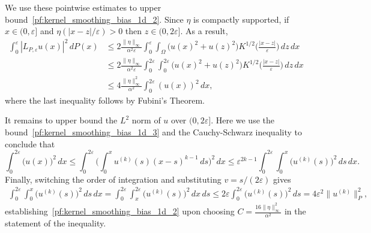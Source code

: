 \documentclass{article}
\newcommand{\1}{\mathbf{1}}
\newcommand{\Leb}{L}
\theoremstyle{definition}
\theoremstyle{remark}
\begin{document}
We use these pointwise estimates to upper bound~\eqref{pf:kernel_smoothing_bias_1d_2}. Since $\eta$ is compactly supported, if $x \in (0,\varepsilon]$ and $\eta(|x - z|/\varepsilon) > 0$ then $z \in (0,2\varepsilon]$. As a result,
\begin{align*}
\int_{0}^{\varepsilon} |L_{P,\varepsilon}u(x)|^2 \,dP(x) & \leq 2\frac{\|\eta\|_{\infty}}{\alpha^2\varepsilon} \int_{0}^{\varepsilon}  \int_{\Omega} \bigl(u(x)^2 + u(z)^2\bigr) K^{1/2}\biggl(\frac{|x - z|}{\varepsilon}\biggr) \,dz \,dx \\
& \leq 2\frac{\|\eta\|_{\infty}}{\alpha^2\varepsilon} \int_{0}^{2\varepsilon}  \int_{0}^{2\varepsilon} \bigl(u(x)^2 + u(z)^2\bigr) K^{1/2}\biggl(\frac{|x - z|}{\varepsilon}\biggr) \,dz \,dx \\
& \leq 4\frac{\|\eta\|_{\infty}^2}{\alpha^2} \int_{0}^{2\varepsilon} (u(x))^2 \,dx,
\end{align*}
where the last inequality follows by Fubini's Theorem.

It remains to upper bound the $\Leb^2$ norm of $u$ over $(0,2\varepsilon]$. Here we use the bound~\eqref{pf:kernel_smoothing_bias_1d_3} and the Cauchy-Schwarz inequality to conclude that 
\begin{equation*}
\int_{0}^{2\varepsilon} \bigl(u(x)\bigr)^2 \,dx \leq \int_{0}^{2\varepsilon} \biggl(\int_{0}^{x} u^{(k)}(s)(x - s)^{k - 1} \,ds\biggr)^2 \,dx \leq \varepsilon^{2k - 1} \int_{0}^{2\varepsilon} \int_{0}^{x} \bigl(u^{(k)}(s)\bigr)^2 \,ds \,dx. 
\end{equation*}
Finally, switching the order of integration and substituting $v = s/(2\varepsilon)$ gives
\begin{align*}
\int_{0}^{2\varepsilon} \int_{0}^{x} \bigl(u^{(k)}(s)\bigr)^2 \,ds \,dx = \int_{0}^{2\varepsilon} \int_{x}^{2\varepsilon} \bigl(u^{(k)}(s)\bigr)^2 \,dx \,ds \leq 2\varepsilon \int_{0}^{2\varepsilon} \bigl(u^{(k)}(s)\bigr)^2 \,ds = 4\varepsilon^2 \|u^{(k)}\|_P^2,
\end{align*}
establishing~\eqref{pf:kernel_smoothing_bias_1d_2} upon choosing $C = \frac{16\|\eta\|_{\infty}^2}{\alpha^2}$ in the statement of the inequality.
\end{document}
